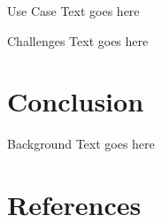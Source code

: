 \documentclass[t]{beamer}
\begin{document}
\begin{frame}{Use Case}
  Text goes here
\end{frame}

\begin{frame}{Challenges}
  Text goes here
\end{frame}

\section{Conclusion}
\begin{frame}{Background}
  Text goes here
\end{frame}

\section{References}
\begin{frame}{}
  \begin{thebibliography}
  \end{thebibliography}
\end{frame}
\end{document}
